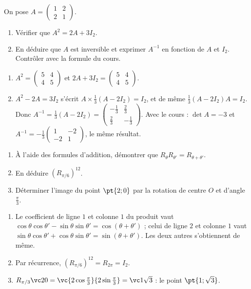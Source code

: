 \begin{exercise}
On pose $A=\begin{pmatrix}1&2\\2&1\end{pmatrix}$.
\begin{enumerate}
\item Vérifier que $A^2=2A+3I_2$.
\item En déduire que $A$ est inversible et exprimer $A^{-1}$ en fonction de $A$ et $I_2$. Contrôler avec la formule du cours.
\end{enumerate}
\end{exercise}
\begin{solution}
\begin{enumerate}
\item $A^2=\begin{pmatrix}5&4\\4&5\end{pmatrix}$ et $2A+3I_2=\begin{pmatrix}5&4\\4&5\end{pmatrix}$.
\item $A^2-2A=3I_2$ s'écrit $A\times\frac13(A-2I_2)=I_2$, et de même $\frac13(A-2I_2)A=I_2$. Donc $A^{-1}=\frac13(A-2I_2)=\begin{pmatrix}-\frac13&\frac23\\\frac23&-\frac13\end{pmatrix}$. Avec le cours : $\det A=-3$ et $A^{-1}=-\frac13\begin{pmatrix}1&-2\\-2&1\end{pmatrix}$, le même résultat.
\end{enumerate}
\end{solution}

\begin{exercise}[Rotations]
\begin{enumerate}
\item À l'aide des formules d'addition, démontrer que $R_\theta R_{\theta'}=R_{\theta+\theta'}$.
\item En déduire $\left(R_{\pi/6}\right)^{12}$.
\item Déterminer l'image du point $\pt{2;0}$ par la rotation de centre $O$ et d'angle $\frac\pi3$.
\end{enumerate}
\end{exercise}
\begin{solution}
\begin{enumerate}
\item Le coefficient de ligne $1$ et colonne $1$ du produit vaut $\cos\theta\cos\theta'-\sin\theta\sin\theta'=\cos(\theta+\theta')$ ; celui de ligne $2$ et colonne $1$ vaut $\sin\theta\cos\theta'+\cos\theta\sin\theta'=\sin(\theta+\theta')$. Les deux autres s'obtiennent de même.
\item Par récurrence, $\left(R_{\pi/6}\right)^{12}=R_{2\pi}=I_2$.
\item $R_{\pi/3}\vc20=\vc{2\cos\frac\pi3}{2\sin\frac\pi3}=\vc1{\sqrt3}$ : le point $\pt{1;\sqrt3}$.
\end{enumerate}
\end{solution}

